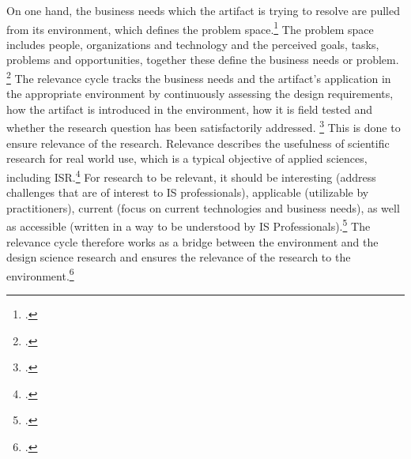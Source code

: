  \label{topic:relevance cycle}
On one hand, the business needs which the artifact is trying to resolve are pulled from its environment, which defines the problem space.\footcites[Cf.][p.??]{Simonsciencesartificial1996}[cf.][p.79]{HevnerDesignScienceResearch2004} The problem space includes people, organizations and technology and the perceived goals, tasks, problems and opportunities, together these define the business needs or problem. \footcite[Cf.][p.79]{HevnerDesignScienceResearch2004} The relevance cycle tracks the business needs and the artifact's application in the appropriate environment by continuously assessing the design requirements, how the artifact is introduced in the environment, how it is field tested and whether the research question has been satisfactorily addressed. \footcites[Cf.][p.89]{Hevnerthreecycleview2007}[cf.][p.19]{HevnerDesignResearchInformation2010} This is done to ensure relevance of the research. Relevance describes the usefulness of scientific research for real world use, which is a typical objective of applied sciences, including ISR.\footcite[Cf.][p.129]{ThomasBekannteundweniger2014} For research to be relevant, it should be interesting (address challenges that are of interest to IS professionals), applicable (utilizable by practitioners), current (focus on current technologies and business needs), as well as accessible (written in a way to be understood by IS Professionals).\footcite[Cf.][p.5]{BenbasatEmpiricalresearchinformation1999} The relevance cycle therefore works as a bridge between the environment and the design science research and ensures the relevance of the research to the environment.\footcite[Cf.][p.89]{Hevnerthreecycleview2007} 

